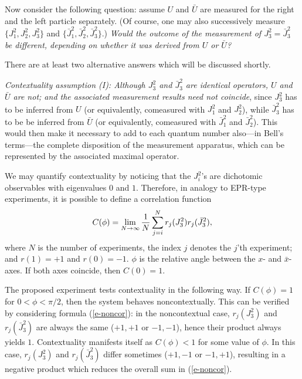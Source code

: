 Now consider the following question: assume $U$
and
$\bar U$ are measured for the right and the left particle separately.
(Of course, one may also successively measure
$\{
J_1^2,
J_2^2,
J_3^2\}$
and
$\{
\bar{J}_1^2,
\bar{J}_2^2,
\bar{J}_3^2\}$.)
{\em Would the outcome of the measurement of $J_3^2=\bar J_3^2$ be
different, depending on whether it was derived from $U$ or $\bar U$?}

There are at least two alternative answers which will be discussed
shortly.

{\em Contextuality assumption (I):
Although
$J_3^2$ and
$\bar J^2_3$ are identical operators,  $U$ and $\bar U$ are not;
and
the associated measurement results need {\em not} coincide}, since
$J_3^2$ has to be inferred from $U$ (or equivalently, comeasured with
$J_1^2$  and
$J_2^2$),
while
$\bar J_3^2$
has to be be inferred from $\bar U$ (or equivalently, comeasured with
$\bar J_1^2$ and
$\bar J_2^2$). This would then make it necessary to add to each quantum
number also---in Bell's terms---the complete disposition of the
measurement apparatus, which can be represented by the associated
maximal operator.
%


We may quantify contextuality by
noticing  that the $J^2_i$'s are dichotomic observables with
eigenvalues $0$ and $1$. Therefore, in analogy to EPR-type experiments,
it is possible to define a correlation function
\begin{equation}
C(\phi )=\lim_{N\rightarrow \infty}{1\over N}\sum_{j=i}^N
r_j(J_3^2)r_j(\bar J_3^2),
\label{e-noncor}
\end{equation}
where $N$ is the number of experiments, the index $j$ denotes the $j$'th
experiment; and $r(1)=+1$ and $r(0)=-1$. $\phi $ is the relative
angle between the $x$- and $\bar x$-axes. If both axes coincide, then
$C(0)=1$.

The proposed experiment tests contextuality in the following way. If
$C(
\phi
)=1$ for
$0< \phi <\pi /2$, then the system behaves noncontextually.
This can be  verified by considering formula
(\ref{e-noncor}): in the noncontextual case,
$r_j(J_3^2)$ and $r_j(\bar J_3^2)$ are always the same ($+1,+1$ or $-1,-1$),
hence their product always yields $1$.
Contextuality manifests itself as $C(\phi)<1$ for some value of
$\phi$.
In this case,
$r_j(J_3^2)$ and $r_j(\bar J_3^2)$ differ sometimes ($+1,-1$ or $-1,+1$),
resulting in a negative product which reduces the overall sum in
(\ref{e-noncor}).

